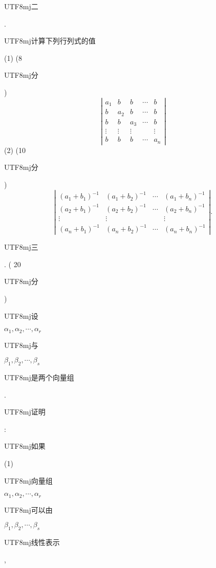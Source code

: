 \documentclass[10pt]{article}
\begin{document}
\begin{CJK}{UTF8}{mj}二\end{CJK}. \begin{CJK}{UTF8}{mj}计算下列行列式的值\end{CJK}

(1) (8 \begin{CJK}{UTF8}{mj}分\end{CJK})
$$
\left|\begin{array}{ccccc}
a_{1} & b & b & \cdots & b \\
b & a_{2} & b & \cdots & b \\
b & b & a_{3} & \cdots & b \\
\vdots & \vdots & \vdots & & \vdots \\
b & b & b & \cdots & a_{n}
\end{array}\right|
$$
(2) (10 \begin{CJK}{UTF8}{mj}分\end{CJK})
$$
\left|\begin{array}{cccc}
\left(a_{1}+b_{1}\right)^{-1} & \left(a_{1}+b_{2}\right)^{-1} & \cdots & \left(a_{1}+b_{n}\right)^{-1} \\
\left(a_{2}+b_{1}\right)^{-1} & \left(a_{2}+b_{2}\right)^{-1} & \cdots & \left(a_{2}+b_{n}\right)^{-1} \\
\vdots & \vdots & & \vdots \\
\left(a_{n}+b_{1}\right)^{-1} & \left(a_{n}+b_{2}\right)^{-1} & \cdots & \left(a_{n}+b_{n}\right)^{-1}
\end{array}\right| .
$$
\begin{CJK}{UTF8}{mj}三\end{CJK}. ( 20 \begin{CJK}{UTF8}{mj}分\end{CJK}) \begin{CJK}{UTF8}{mj}设\end{CJK} $\alpha_{1}, \alpha_{2}, \cdots, \alpha_{r}$ \begin{CJK}{UTF8}{mj}与\end{CJK} $\beta_{1}, \beta_{2}, \cdots, \beta_{s}$ \begin{CJK}{UTF8}{mj}是两个向量组\end{CJK}. \begin{CJK}{UTF8}{mj}证明\end{CJK}: \begin{CJK}{UTF8}{mj}如果\end{CJK}

(1)\begin{CJK}{UTF8}{mj}向量组\end{CJK} $\alpha_{1}, \alpha_{2}, \cdots, \alpha_{r}$ \begin{CJK}{UTF8}{mj}可以由\end{CJK} $\beta_{1}, \beta_{2}, \cdots, \beta_{s}$ \begin{CJK}{UTF8}{mj}线性表示\end{CJK},
\end{document}
